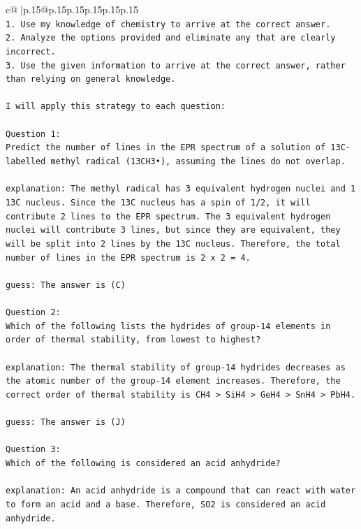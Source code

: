 \documentclass{article}
\begin{document}
{\begin{supertabular}{c@{$\;$}|p{.15\linewidth}@{}p{.15\linewidth}p{.15\linewidth}p{.15\linewidth}p{.15\linewidth}p{.15\linewidth}}
{{{\\ 
\texttt{1. Use my knowledge of chemistry to arrive at the correct answer.} \\
\texttt{2. Analyze the options provided and eliminate any that are clearly incorrect.} \\
\texttt{3. Use the given information to arrive at the correct answer, rather than relying on general knowledge.} \\
\\ 
\texttt{I will apply this strategy to each question:} \\
\\ 
\texttt{Question 1:} \\
\texttt{Predict the number of lines in the EPR spectrum of a solution of 13C{-}labelled methyl radical (13CH3•), assuming the lines do not overlap.} \\
\\ 
\texttt{explanation: The methyl radical has 3 equivalent hydrogen nuclei and 1 13C nucleus. Since the 13C nucleus has a spin of 1/2, it will contribute 2 lines to the EPR spectrum. The 3 equivalent hydrogen nuclei will contribute 3 lines, but since they are equivalent, they will be split into 2 lines by the 13C nucleus. Therefore, the total number of lines in the EPR spectrum is 2 x 2 = 4.} \\
\\ 
\texttt{guess: The answer is (C)} \\
\\ 
\texttt{Question 2:} \\
\texttt{Which of the following lists the hydrides of group{-}14 elements in order of thermal stability, from lowest to highest?} \\
\\ 
\texttt{explanation: The thermal stability of group{-}14 hydrides decreases as the atomic number of the group{-}14 element increases. Therefore, the correct order of thermal stability is CH4 > SiH4 > GeH4 > SnH4 > PbH4.} \\
\\ 
\texttt{guess: The answer is (J)} \\
\\ 
\texttt{Question 3:} \\
\texttt{Which of the following is considered an acid anhydride?} \\
\\ 
\texttt{explanation: An acid anhydride is a compound that can react with water to form an acid and a base. Therefore, SO2 is considered an acid anhydride.} \\
}}}
\end{supertabular}}
\end{document}
